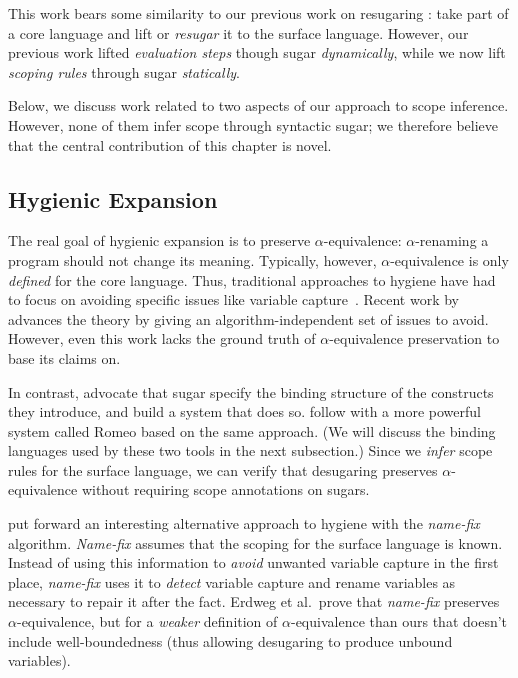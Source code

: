 This work bears some similarity to our previous work on resugaring
\cite{pombrio-resugar,pombrio-resugar-hygienic}:
take part of a core
language and lift or \emph{resugar} it to the surface
language. However, our previous work
lifted \emph{evaluation steps} though sugar
\emph{dynamically}, while we now lift \emph{scoping rules} through sugar
\emph{statically}.

Below, we discuss work related to two aspects of our approach to
scope inference. However, none of them infer scope through syntactic
sugar; we therefore believe that the central contribution of this
chapter is novel.

\subsection{Hygienic Expansion}

The real goal of hygienic expansion is to preserve
$\alpha$-equivalence: $\alpha$-renaming a program should not change
its meaning. Typically, however, $\alpha$-equivalence is only
\emph{defined} for the core language. Thus, traditional approaches to
hygiene have had to focus on avoiding specific issues like
variable capture~\cite{hygienic-macros}.
Recent work by \cite{adams-hygiene} advances the theory by
giving an algorithm-independent set of issues to
avoid. However, even this work lacks the ground truth of
$\alpha$-equivalence preservation to base its claims on.

In contrast, \cite{herman-hygiene}
advocate that sugar specify the binding structure of the constructs
they introduce, and build a system that does so.
\cite{stansifer-romeo} follow with a more powerful system
called Romeo based on the same approach.
(We will discuss the binding languages used by these two tools in the
next subsection.)
Since we \emph{infer} scope rules for the surface language, we can
verify that desugaring preserves $\alpha$-equivalence without
requiring scope annotations on sugars.

\cite{erdweg-hygiene} put forward an interesting alternative approach to hygiene
with the \emph{name-fix} algorithm.
\emph{Name-fix} assumes that the scoping for the surface language is
known. Instead of using this information to \emph{avoid} unwanted
variable capture in the first place, \emph{name-fix} uses it
to \emph{detect} variable capture and rename variables as necessary to
repair it after the fact. Erdweg et al.\ prove that \emph{name-fix}
preserves $\alpha$-equivalence, but for a \emph{weaker} definition
of $\alpha$-equivalence than ours that doesn't include
well-boundedness (thus allowing desugaring to produce unbound variables).

